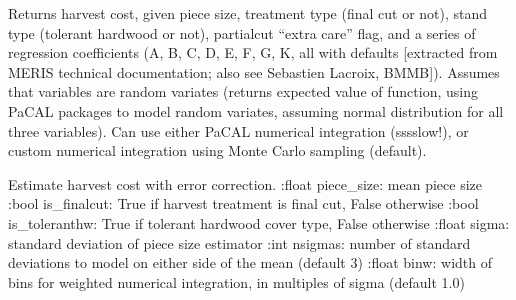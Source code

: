 \documentclass[letterpaper,10pt,english]{sphinxmanual}
\begin{document}

\begin{fulllineitems}
\label{\detokenize{common:common.harv_cost_rv}}
Returns harvest cost, given piece size, treatment type (final cut or not), stand type (tolerant hardwood or not), partialcut “extra care” flag, and a series of regression coefficients (A, B, C, D, E, F, G, K, all with defaults {[}extracted from MERIS technical documentation; also see Sebastien Lacroix, BMMB{]}). 
Assumes that variables are random variates (returns expected value of function, using PaCAL packages to model random variates, assuming normal distribution for all three variables).
Can use either PaCAL numerical integration (sssslow!), or custom numerical integration using Monte Carlo sampling (default).

\end{fulllineitems}


\begin{fulllineitems}
\label{\detokenize{common:common.harv_cost_wec}}
Estimate harvest cost with error correction.
:float piece\_size: mean piece size
:bool is\_finalcut: True if harvest treatment is final cut, False otherwise
:bool is\_toleranthw: True if tolerant hardwood cover type, False otherwise
:float sigma: standard deviation of piece size estimator
:int nsigmas: number of standard deviations to model on either side of the mean (default 3)
:float binw: width of bins for weighted numerical integration, in multiples of sigma (default 1.0)

\end{fulllineitems}


\begin{fulllineitems}
\label{\detokenize{common:common.hash_dt}}
\end{fulllineitems}
\end{document}
